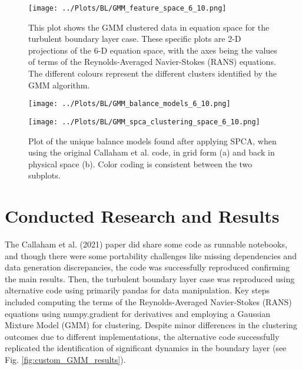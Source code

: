 \documentclass[12pt]{report} %
\begin{document}
\begin{figure}[h]
  \centering
  \texttt{[image: ../Plots/BL/GMM\_feature\_space\_6\_10.png]}
  \caption{This plot shows the GMM clustered data in equation space for the turbulent boundary layer case. These specific plots are 2-D projections of the 6-D equation space, with the axes being the values of terms of the Reynolds-Averaged Navier-Stokes (RANS) equations. The different colours represent the different clusters identified by the GMM algorithm.}
  \label{fig:EquationSpace}
\end{figure}

\begin{figure}[htbp]
  \centering
  \begin{minipage}[b]{0.6\textwidth}
      \centering
      \texttt{[image: ../Plots/BL/GMM\_balance\_models\_6\_10.png]}
      \subcaption{}
  \end{minipage}

  \begin{minipage}[b]{0.6\textwidth}
      \centering
      \texttt{[image: ../Plots/BL/GMM\_spca\_clustering\_space\_6\_10.png]}
      \subcaption{}
  \end{minipage}

  \caption{Plot of the unique balance models found after applying SPCA, when using the original Callaham et al. code, in grid form (a) and back in physical space (b). Color coding is consistent between the two subplots.}
  \label{fig:GMM_results}
\end{figure}


\section{Conducted Research and Results}

The Callaham et al. (2021) paper did share some code as runnable notebooks, and though there were some portability challenges like missing dependencies and data generation discrepancies, the code was successfully reproduced confirming the main results. Then, the turbulent boundary layer case was reproduced using alternative code using primarily pandas for data manipulation. Key steps included computing the terms of the Reynolds-Averaged Navier-Stokes (RANS) equations using numpy.gradient for derivatives and employing a Gaussian Mixture Model (GMM) for clustering. Despite minor differences in the clustering outcomes due to different implementations, the alternative code successfully replicated the identification of significant dynamics in the boundary layer (see Fig. \ref{fig:custom_GMM_results}).
\end{document}
